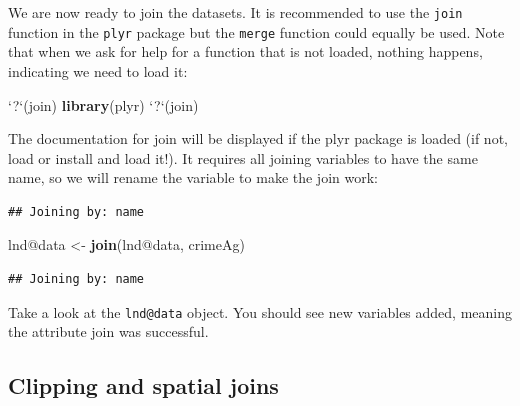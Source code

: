 \documentclass[]{article}
\newenvironment{Shaded}{}{}
\newcommand{\KeywordTok}[1]{\textcolor[rgb]{0.00,0.44,0.13}{\textbf{{#1}}}}
\newcommand{\DataTypeTok}[1]{\textcolor[rgb]{0.56,0.13,0.00}{{#1}}}
\newcommand{\StringTok}[1]{\textcolor[rgb]{0.25,0.44,0.63}{{#1}}}
\newcommand{\CommentTok}[1]{\textcolor[rgb]{0.38,0.63,0.69}{\textit{{#1}}}}
\newcommand{\NormalTok}[1]{{#1}}
\begin{document}
We are now ready to join the datasets. It is recommended to use the
\texttt{join} function in the \texttt{plyr} package but the
\texttt{merge} function could equally be used. Note that when we ask for
help for a function that is not loaded, nothing happens, indicating we
need to load it:

\begin{Shaded}
\begin{Highlighting}[]
\StringTok{`}\DataTypeTok{?}\StringTok{`}\NormalTok{(join)}
\KeywordTok{library}\NormalTok{(plyr)}
\StringTok{`}\DataTypeTok{?}\StringTok{`}\NormalTok{(join)}
\end{Highlighting}
\end{Shaded}
The documentation for join will be displayed if the plyr package is
loaded (if not, load or install and load it!). It requires all joining
variables to have the same name, so we will rename the variable to make
the join work:

\begin{Shaded}
\end{Shaded}
\begin{verbatim}
## Joining by: name
\end{verbatim}
\begin{Shaded}
\begin{Highlighting}[]
\NormalTok{lnd@data <- }\KeywordTok{join}\NormalTok{(lnd@data, crimeAg)}
\end{Highlighting}
\end{Shaded}
\begin{verbatim}
## Joining by: name
\end{verbatim}
Take a look at the \texttt{lnd@data} object. You should see new
variables added, meaning the attribute join was successful.

\subsection{Clipping and spatial joins}
\end{document}
